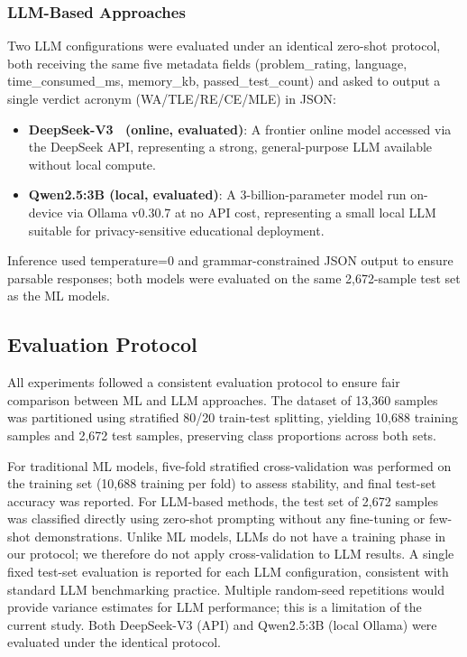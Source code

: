 \documentclass[acmsmall]{acmart}
\begin{document}
\subsubsection*{LLM-Based Approaches}
Two LLM configurations were evaluated under an identical zero-shot protocol,
both receiving the same five metadata fields (problem\_rating, language,
time\_consumed\_ms, memory\_kb, passed\_test\_count) and asked to output a
single verdict acronym (WA/TLE/RE/CE/MLE) in JSON:
\begin{itemize}
    \item \textbf{DeepSeek-V3~\cite{deepseek2024deepseekv3} (online, evaluated)}: A frontier online model
          accessed via the DeepSeek API, representing a strong,
          general-purpose LLM available without local compute.
    \item \textbf{Qwen2.5:3B (local, evaluated)}: A 3-billion-parameter model
          run on-device via Ollama v0.30.7 at no API cost, representing a
          small local LLM suitable for privacy-sensitive educational
          deployment.
\end{itemize}
Inference used temperature=0 and grammar-constrained JSON output to ensure
parsable responses; both models were evaluated on the same 2,672-sample test
set as the ML models.

\subsection{Evaluation Protocol}

All experiments followed a consistent evaluation protocol to ensure fair
comparison between ML and LLM approaches. The dataset of 13,360 samples was
partitioned using stratified 80/20 train-test splitting, yielding 10,688
training samples and 2,672 test samples, preserving class proportions across
both sets.

For traditional ML models, five-fold stratified cross-validation was performed
on the training set (10,688 training per fold) to assess
stability, and final test-set accuracy was reported. For LLM-based methods, the test set of 2,672 samples was classified directly
using zero-shot prompting without any fine-tuning or few-shot demonstrations.
Unlike ML models, LLMs do not have a training phase in our protocol; we therefore
do not apply cross-validation to LLM results. A single fixed test-set evaluation
is reported for each LLM configuration, consistent with standard LLM benchmarking
practice. Multiple random-seed repetitions would provide variance estimates for
LLM performance; this is a limitation of the current study.
Both DeepSeek-V3 (API) and Qwen2.5:3B (local Ollama) were evaluated under the
identical protocol.
\end{document}
